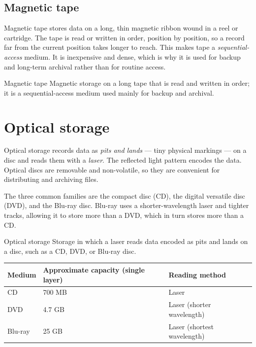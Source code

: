 \subsection{Magnetic tape}
Magnetic tape stores data on a long, thin magnetic ribbon wound in a reel or
cartridge. The tape is read or written in order, position by position, so a
record far from the current position takes longer to reach. This makes tape a
\emph{sequential-access} medium. It is inexpensive and dense, which is why it
is used for backup and long-term archival rather than for routine access.

\begin{definitionbox}{Magnetic tape}
Magnetic storage on a long tape that is read and written in order; it is a
sequential-access medium used mainly for backup and archival.
\end{definitionbox}

\section{Optical storage}
Optical storage records data as \emph{pits and lands} --- tiny physical
markings --- on a disc and reads them with a \emph{laser}. The reflected light
pattern encodes the data. Optical discs are removable and non-volatile, so
they are convenient for distributing and archiving files.

The three common families are the compact disc (CD), the digital versatile
disc (DVD), and the Blu-ray disc. Blu-ray uses a shorter-wavelength laser and
tighter tracks, allowing it to store more than a DVD, which in turn stores
more than a CD.

\begin{definitionbox}{Optical storage}
Storage in which a laser reads data encoded as pits and lands on a disc, such
as a CD, DVD, or Blu-ray disc.
\end{definitionbox}

\begin{center}
\begin{tabular}{lll}
\toprule
\textbf{Medium} & \textbf{Approximate capacity (single layer)} &
\textbf{Reading method}\\
\midrule
CD & 700 MB & Laser\\
DVD & 4.7 GB & Laser (shorter wavelength)\\
Blu-ray & 25 GB & Laser (shortest wavelength)\\
\bottomrule
\end{tabular}
\end{center}

